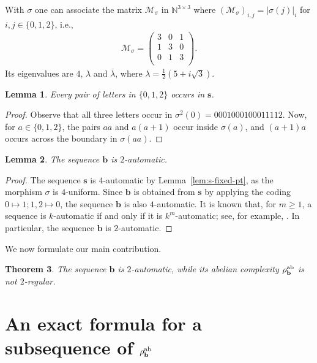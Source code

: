 \documentclass[12pt]{article}
\theoremstyle{plain}
\newtheorem{theorem}{Theorem}
\newtheorem{lemma}[theorem]{Lemma}
\theoremstyle{definition}
\theoremstyle{remark}
\newcommand{\N}{\mathbb{N}}
\numberwithin{equation}{section}
\begin{document}
With $\sigma$ one can associate the matrix $\mathcal{M}_\sigma$ in $\N^{3\times 3}$ where $(\mathcal{M}_\sigma)_{i,j}=\lvert\sigma(j)\rvert_i$ for $i,j\in\{0,1,2\}$, i.e.,
\begin{align}
\label{eq:matrix-sigma}
\mathcal{M}_\sigma=\begin{pmatrix}
    3& 0& 1\\ 1& 3 & 0\\ 0& 1& 3\\
\end{pmatrix}.
\end{align}
Its eigenvalues are $4$, $\lambda$ and $\overline{\lambda}$, where $\lambda=\frac{1}{2} \left(5+ i \sqrt{3}\right)$.

\begin{lemma}
\label{lem:pair-of-letters}
Every pair of letters in $\{0,1,2\}$ occurs in $\mathbf{s}$.
\end{lemma}
\begin{proof}
Observe that all three letters occur in $\sigma^2(0)=0001000100011112$.
Now, for $a\in\{0,1,2\}$, the pairs
$aa$ and $a(a+1)$ occur inside $\sigma(a)$, and $(a+1)a$
occurs across the boundary in $\sigma(aa)$.
\end{proof}





\begin{lemma}
\label{lem:b-2auto}
The sequence $\mathbf{b}$ is $2$-automatic.
\end{lemma}
\begin{proof}
The sequence $\mathbf{s}$ is $4$-automatic by Lemma~\ref{lem:s-fixed-pt}, as the morphism $\sigma$ is $4$-uniform.
Since $\mathbf{b}$ is obtained from $\mathbf{s}$ by applying the coding $0\mapsto 1; 1,2\mapsto 0$, the sequence $\mathbf{b}$ is also $4$-automatic. 
It is known that, for $m \geq 1$, a sequence is $k$-automatic 
if and only if it is $k^m$-automatic; see, for example,
\cite[Thm.~6.6.4]{Allouche&Shallit:2003}.
In particular, the sequence 
$\mathbf{b}$ is $2$-automatic.
\end{proof}

We now formulate our main contribution.


\begin{theorem}\label{thm:main}
The sequence $\mathbf{b}$ is $2$-automatic, while its abelian complexity $\rho_{\mathbf{b}}^{\rm ab}$ is not $2$-regular.
\end{theorem}



\section{An exact formula for a subsequence of
\texorpdfstring{$\rho_{\mathbf{b}}^{\rm ab}$}{rho b ab}}
\end{document}
